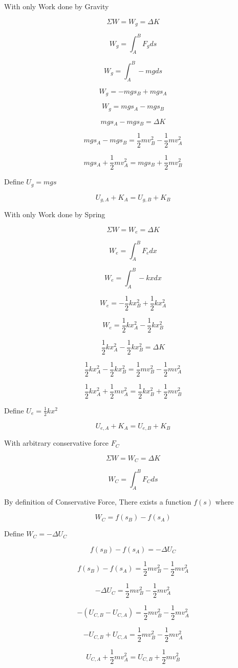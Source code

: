 \documentclass[12pt,letterpaper]{article}
\begin{document}
With only Work done by Gravity

$$\Sigma W = W_g = \Delta K$$

$$W_g = \int_{A}^{B} F_{g} ds$$

$$W_g = \int_{A}^{B} -mg ds$$

$$W_g = -mgs_B + mgs_A$$

$$W_g = mgs_A - mgs_B$$

$$mgs_A - mgs_B = \Delta K$$

$$mgs_A - mgs_B = \frac{1}{2}mv_B^2 - \frac{1}{2}mv_A^2$$

$$mgs_A + \frac{1}{2}mv_A^2  = mgs_B + \frac{1}{2}mv_B^2 $$

Define $U_g = mgs$

$$U_{g, A} + K_A = U_{g, B} + K_B$$

\pagebreak

With only Work done by Spring

$$\Sigma W = W_e = \Delta K$$

$$W_e = \int_{A}^{B} F_e dx$$

$$W_e = \int_{A}^{B} -kx dx$$

$$W_e = -\frac{1}{2}kx_B^2  + \frac{1}{2}kx_A^2$$

$$W_e =  \frac{1}{2}kx_A^2 - \frac{1}{2}kx_B^2$$


$$\frac{1}{2}kx_A^2 - \frac{1}{2}kx_B^2 = \Delta K$$

$$\frac{1}{2}kx_A^2 - \frac{1}{2}kx_B^2 = \frac{1}{2}mv_B^2 - \frac{1}{2}mv_A^2$$

$$\frac{1}{2}kx_A^2  + \frac{1}{2}mv_A^2 = \frac{1}{2}kx_B^2 + \frac{1}{2}mv_B^2$$

Define $U_e = \frac{1}{2}kx^2$

$$U_{e, A} + K_A = U_{e, B} + K_B$$

\pagebreak

With arbitrary conservative force $F_C$

$$\Sigma W = W_C = \Delta K$$

$$W_C = \int_{A}^{B} F_C ds$$

By definition of Conservative Force, There exists a function $f(s)$ where

$$W_C = f(s_B) - f(s_A)$$

Define $W_C = -\Delta U_C$

$$f(s_B) - f(s_A) =  -\Delta U_C$$

$$f(s_B) - f(s_A) = \frac{1}{2}mv_B^2 - \frac{1}{2}mv_A^2$$

$$-\Delta U_C = \frac{1}{2}mv_B^2 - \frac{1}{2}mv_A^2$$

$$-(U_{C,B} - U_{C,A }) = \frac{1}{2}mv_B^2 - \frac{1}{2}mv_A^2$$

$$-U_{C,B} + U_{C,A } = \frac{1}{2}mv_B^2 - \frac{1}{2}mv_A^2$$

$$U_{C,A } + \frac{1}{2}mv_A^2 = U_{C,B} + \frac{1}{2}mv_B^2$$

\pagebreak
\end{document}
